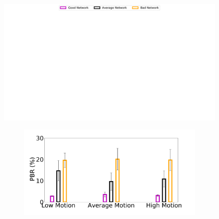 \begin{figure}
    \includegraphics[trim={2.5cm 24.5cm 2.5cm 0},clip,width=\linewidth]{sections/network-work/legend4.pdf}
    \begin{subfigure}[b]{0.33\textwidth}
        \centering
        \includegraphics[width=1\linewidth]{sections/network-work/content-bitrate}

\end{subfigure}
\end{figure}
